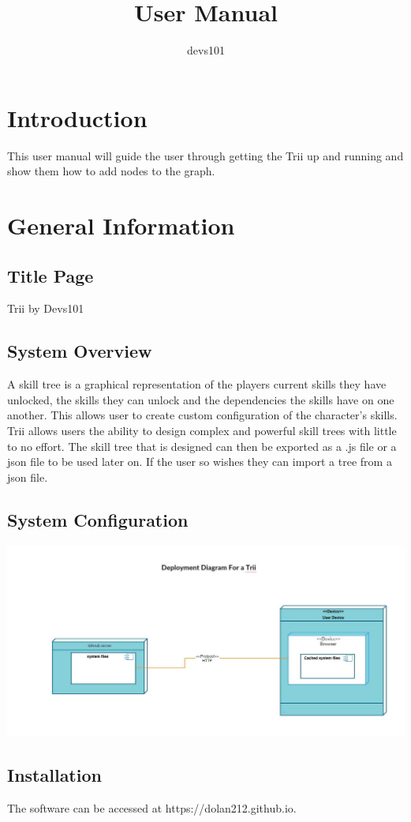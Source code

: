 \documentclass{article}
\title{User Manual}
\author{devs101}
\begin{document}
\maketitle
\tableofcontents
\newpage

\section{Introduction}
This user manual will guide the user through getting the Trii up and running and show them how to add nodes to the graph.
\section{General Information}
\subsection{Title Page}
Trii by Devs101
\subsection{System Overview}
A skill tree is a graphical representation of the players current skills they have unlocked, the skills they can unlock and the dependencies the skills have on one another. This allows user to create custom configuration of the character's skills. Trii allows users the ability to design complex and powerful skill trees with little to no effort. The skill tree that is designed can then be exported as a .js file or a json file to be used later on. If the user so wishes they can import a tree from a json file.
\subsection{System Configuration}
\includegraphics[scale=0.3]{deployment}\\
\subsection{Installation}
The software can be accessed at https://dolan212.github.io.
\end{document}
